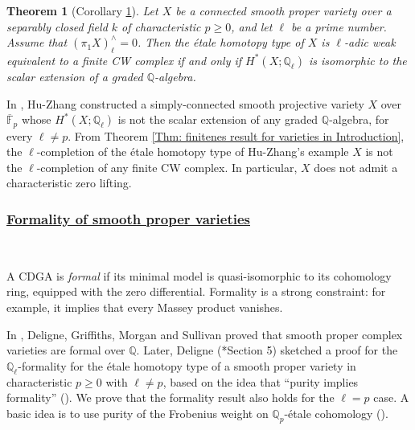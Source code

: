 \documentclass[11pt]{amsart}
\newtheorem{theorem}{Theorem}[section]
\theoremstyle{definition}
\numberwithin{equation}{section}
\numberwithin{equation}{section}
\newcommand\QQ{\mathbb{Q}}
\newcommand\FF{\mathbb{F}}
\DeclareMathOperator{\et}{\acute{e}t}
\begin{document}
\begin{theorem}[Corollary \ref{Cor: finite CW complex for positive haract3eristic variety}]
\label{Cor: finite CW complex for positive haract3eristic variety}\label{Thm: finitenes result for varieties in Introduction}
Let $X$ be a connected smooth proper variety over a separably closed field $k$ of characteristic $p\geq 0$, and let $\ell$ be a prime number. Assume that $(\pi_1^{\et}X)^{\wedge}_{\ell}=0$. Then the \'etale homotopy type of $X$ is $\ell$-adic weak equivalent to a finite CW complex if and only if $H^*_{\et}(X;\QQ_{\ell})$ is isomorphic to the scalar extension of a graded $\QQ$-algebra.
\end{theorem}

In \cite{Hu-Zhang-nonliftable-varieties}, Hu-Zhang constructed a simply-connected smooth projective variety $X$ over $\overline{\FF}_p$ whose $H^*_{\et}(X;\QQ_{\ell})$ is not the scalar extension of any graded $\QQ$-algebra, for every $\ell\neq p$. From Theorem \ref{Thm: finitenes result for varieties in Introduction}, the $\ell$-completion of the \'etale homotopy type of Hu-Zhang's example $X$ is not the $\ell$-completion of any finite CW complex. In particular, $X$ does not admit a characteristic zero lifting.

\subsubsection*{\underline{Formality of smooth proper varieties}}\,

A CDGA is \textit{formal} if its minimal model is quasi-isomorphic to its cohomology ring, equipped with the zero differential. Formality is a strong constraint: for example, it implies that every Massey product vanishes.

In \cite{Deligne-Griffiths-Morgan-Sullivan-formality}, Deligne, Griffiths, Morgan and Sullivan proved that smooth proper complex varieties are formal over $\QQ$. Later, Deligne (\cite{Deligne-Weil-II}*{Section 5}) sketched a proof for the $\QQ_{\ell}$-formality for the \'etale homotopy type of a smooth proper variety in characteristic $p\geq 0$ with $\ell\neq p$, based on the idea that ``purity implies formality'' (\cite{Cirici-Horel-formality-torsion-coefficient}\cite{Emprin-Horel-weight-and-formality}). We prove that the formality result also holds for the $\ell=p$ case. A basic idea is to use purity of the Frobenius weight on $\QQ_p$-\'etale cohomology (\cite{Chiarellotto-le-Stum-on-purity-of-crystalline-cohomology}\cite{Milne-values-of-zeta-functions-of-varieties-over-finite-fields}). 
\end{document}
